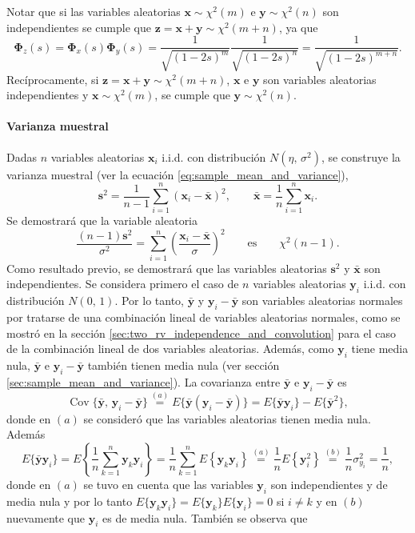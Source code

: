 \documentclass[a4paper]{report}
\newcommand{\x}{\mathbf{x}}
\newcommand{\y}{\mathbf{y}}
\newcommand{\z}{\mathbf{z}}
\newcommand{\Phibf}{\mathbf{\Phi}}
\begin{document}
Notar que si las variables aleatorias \(\x\sim\chi^2(m)\) e \(\y\sim\chi^2(n)\) son independientes se cumple que \(\z=\x+\y\sim\chi^2(m+n)\), ya que
\[
 \Phibf_z(s)=\Phibf_x(s)\Phibf_y(s)=\frac{1}{\sqrt{(1-2s)^m}}\frac{1}{\sqrt{(1-2s)^n}}=\frac{1}{\sqrt{(1-2s)^{m+n}}}.
\]
Recíprocamente, si \(\z=\x+\y\sim\chi^2(m+n)\), \(\x\) e \(\y\) son variables aleatorias independientes y \(\x\sim\chi^2(m)\), se cumple que \(\y\sim\chi^2(n)\).

\paragraph{Varianza muestral}

Dadas \(n\) variables aleatorias \(\x_i\) i.i.d. con distribución \(N(\eta,\,\sigma^2)\), se construye la varianza muestral (ver la ecuación \ref{eq:sample_mean_and_variance}),
\[
 \mathbf{s}^2=\frac{1}{n-1}\sum_{i=1}^{n}(\x_i-\bar{\x})^2,\qquad \bar{\x}=\frac{1}{n}\sum_{i=1}^{n}\x_i.
\]
Se demostrará que la variable aleatoria
\begin{equation}\label{eq:normal_sample_variance_density}
 \frac{(n-1)\mathbf{s}^2}{\sigma^2}=\sum_{i=1}^{n}\left(\frac{\x_i-\bar{\x}}{\sigma}\right)^2\qquad\textrm{es}\qquad\chi^2(n-1).
\end{equation}
Como resultado previo, se demostrará que las variables aleatorias \(\mathbf{s}^2\) y \(\bar{\x}\) son independientes. Se considera primero el caso de \(n\) variables aleatorias \(\y_i\) i.i.d. con distribución \(N(0,\,1)\). Por lo tanto, \(\bar{\y}\) y \(\y_i-\bar{\y}\) son variables aleatorias normales por tratarse de una combinación lineal de variables aleatorias normales, como se mostró en la sección \ref{sec:two_rv_independence_and_convolution} para el caso de la combinación lineal de dos variables aleatorias. Además, como \(\y_i\) tiene media nula, \(\bar{\y}\) e \(\y_i-\bar{\y}\) también tienen media nula (ver sección \ref{sec:sample_mean_and_variance}). La covarianza entre \(\bar{\y}\) e \(\y_i-\bar{\y}\) es
\[
 \operatorname{Cov}\{\bar{\y},\,\y_i-\bar{\y}\}\overset{(a)}{=}E\{\bar{\y}(\y_i-\bar{\y})\}=E\{\bar{\y}\y_i\}-E\{{\bar{\y}}^2\},
\]
donde en \((a)\) se consideró que las variables aleatorias tienen media nula. Además
\[
 E\{\bar{\y}\y_i\}=E\left\{\frac{1}{n}\sum_{k=1}^n\y_k\y_i\right\}
 =\frac{1}{n}\sum_{k=1}^nE\left\{\y_k\y_i\right\}
 \overset{(a)}{=}\frac{1}{n}E\left\{\y_i^2\right\}
 \overset{(b)}{=}\frac{1}{n}\sigma^2_{y_i}
 =\frac{1}{n},
\]
donde en \((a)\) se tuvo en cuenta que las variables \(\y_i\) son independientes y de media nula y por lo tanto \(E\{\y_k\y_i\}=E\{\y_k\}E\{\y_i\}=0\) si \(i\neq k\) y en \((b)\) nuevamente que \(\y_i\) es de media nula. También se observa que
\end{document}
